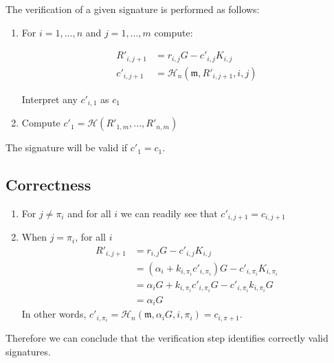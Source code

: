 The verification of a given signature is performed as follows:

\begin{enumerate}
	
	\item For \(i = 1, ..., n \) and \(j = 1, ..., m \) compute:
	

	\begin{align*}
	   R'_{i, j+1} &= r_{i, j} G - c'_{i, j} K_{i, j} \\
	   c'_{i, j+1} &= \mathcal{H}_n (\mathfrak{m}, R'_{i, j+1}, i, j) 
	\end{align*}
	
	Interpret any \(c'_{i, 1}\) as \(c_1\)
	
	\item Compute \(c'_1 = \mathcal{H}(R'_{1, m}, ..., R'_{n, m}) \)	
	
\end{enumerate}

The signature will be valid if \(c'_1 = c_1\).




\subsection*{Correctness}


\begin{enumerate}
	\item For \(j \ne \pi_i\) and for all \(i\) we can readily see that \(c'_{i, j+1} = c_{i, j+1}\)
	
	\item When \(j = \pi_i\), for all \(i \)
	\begin{align*}
	R'_{i, j+1} &= r_{i, j} G - c'_{i, j} K_{i, j} \\
	            &= (\alpha_i + k_{i, \pi_i} c'_{i, \pi_{i}}) G - c'_{i, \pi_i} K_{i, \pi_i} \\
	            &= \alpha_i G + k_{i, \pi_i} c'_{i, \pi_{i}} G - c'_{i, \pi_i} k_{i, \pi_i} G \\
	            &= \alpha_i G 
	\end{align*}
	In other words, \(c'_{i, \pi_i} = \mathcal{H}_n(\mathfrak{m}, \alpha_i G, i, \pi_i) = c_{i, \pi+1}\).
	
\end{enumerate}

Therefore we can conclude that the verification step identifies correctly valid signatures.














 



